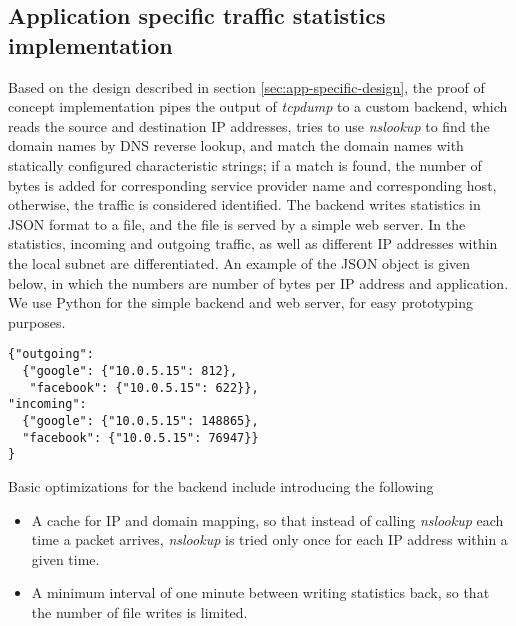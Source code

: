 \subsection{Application specific traffic statistics implementation}

Based on the design described in section \ref{sec:app-specific-design}, the proof of concept implementation pipes the output of \textit{tcpdump} to a custom backend, which reads the source and destination IP addresses, tries to use \textit{nslookup} to find the domain names by DNS reverse lookup, and match the domain names with statically configured characteristic strings; if a match is found, the number of bytes is added for corresponding service provider name and corresponding host, otherwise, the traffic is considered identified. The backend writes statistics in JSON format to a file, and the file is served by a simple web server. In the statistics, incoming and outgoing traffic, as well as different IP addresses within the local subnet are differentiated. An example of the JSON object is given below, in which the numbers are number of bytes per IP address and application. We use Python for the simple backend and web server, for easy prototyping purposes.

\begin{listing}
\begin{verbatim}
{"outgoing": 
  {"google": {"10.0.5.15": 812}, 
   "facebook": {"10.0.5.15": 622}}, 
"incoming": 
  {"google": {"10.0.5.15": 148865}, 
  "facebook": {"10.0.5.15": 76947}}
}
\end{verbatim}
\end{listing}

Basic optimizations for the backend include introducing the following
\begin{itemize}

\item A cache for IP and domain mapping, so that instead of calling \textit{nslookup} each time a packet arrives, \textit{nslookup} is tried only once for each IP address within a given time.

\item A minimum interval of one minute between writing statistics back, so that the number of file writes is limited.

\end{itemize}